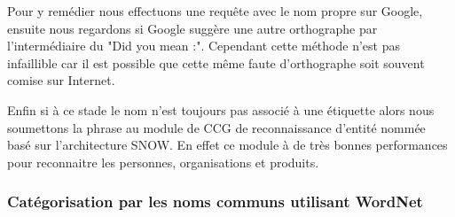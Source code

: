 \documentclass[10pt,a4paper]{article}
\begin{document}
\par Pour y remédier nous effectuons une requête avec le nom propre sur Google, ensuite nous regardons si Google suggère une autre orthographe par l'intermédiaire du "Did you mean :". Cependant cette méthode n'est pas infaillible car il est possible que cette même faute d'orthographe soit souvent comise sur Internet.
\par Enfin si à ce stade le nom n'est toujours pas associé à une étiquette alors nous soumettons la phrase au module de CCG de reconnaissance d'entité nommée~\cite{ratinov:paper} basé sur l'architecture SNOW. En effet ce module à de très bonnes performances pour reconnaitre les personnes, organisations et produits.


\subsubsection{Catégorisation par les noms communs utilisant WordNet}
\end{document}
